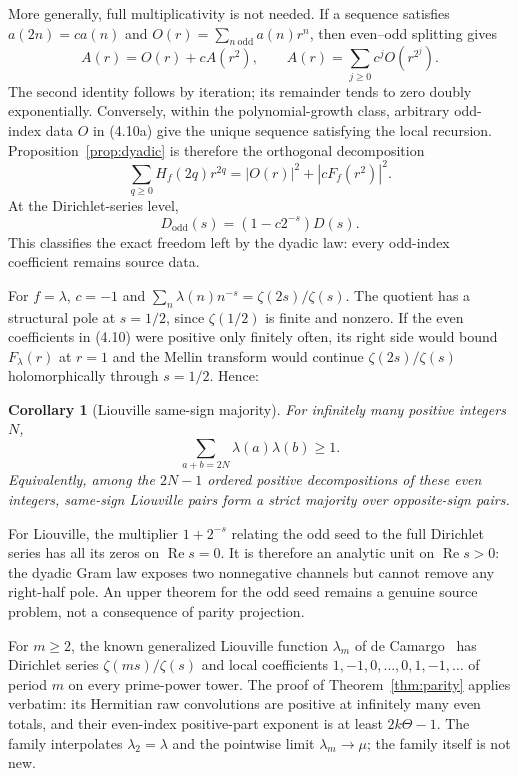 \documentclass[11pt]{article}
\newtheorem{corollary}[theorem]{Corollary}
\theoremstyle{remark}
\newcommand{\Rea}{\operatorname{Re}}
\begin{document}
More generally, full multiplicativity is not needed.  If a sequence satisfies $a(2n)=ca(n)$ and
$O(r)=\sum_{n\ \mathrm{odd}}a(n)r^n$, then even--odd splitting gives
\begin{equation}
 A(r)=O(r)+cA(r^2),
 \qquad
 A(r)=\sum_{j\geq0}c^jO(r^{2^j}).                             \tag{4.10a}
\end{equation}
The second identity follows by iteration; its remainder tends to zero doubly exponentially.
Conversely, within the polynomial-growth class, arbitrary odd-index data $O$ in (4.10a) give the
unique sequence satisfying the local recursion.  Proposition~\ref{prop:dyadic} is therefore the
orthogonal decomposition
\begin{equation}
 \sum_{q\geq0}H_f(2q)r^{2q}=|O(r)|^2+|cF_f(r^2)|^2.           \tag{4.10b}
\end{equation}
At the Dirichlet-series level,
\[
 D_{\mathrm{odd}}(s)=(1-c2^{-s})D(s).
\]
This classifies the exact freedom left by the dyadic law: every odd-index coefficient remains
source data.

For $f=\lambda$, $c=-1$ and
$\sum_n\lambda(n)n^{-s}=\zeta(2s)/\zeta(s)$.  The quotient has a structural pole at
$s=1/2$, since $\zeta(1/2)$ is finite and nonzero.  If the even coefficients in (4.10) were
positive only finitely often, its right side would bound $F_\lambda(r)$ at $r=1$ and the Mellin
transform would continue $\zeta(2s)/\zeta(s)$ holomorphically through $s=1/2$.  Hence:

\begin{corollary}[Liouville same-sign majority]
\label{cor:liouville}
For infinitely many positive integers $N$,
\begin{equation}
 \sum_{a+b=2N}\lambda(a)\lambda(b)\geq1.                     \tag{4.11}
\end{equation}
Equivalently, among the $2N-1$ ordered positive decompositions of these even integers, same-sign
Liouville pairs form a strict majority over opposite-sign pairs.
\end{corollary}

For Liouville, the multiplier $1+2^{-s}$ relating the odd seed to the full Dirichlet series has
all its zeros on $\Rea s=0$.  It is therefore an analytic unit on $\Rea s>0$: the dyadic Gram law
exposes two nonnegative channels but cannot remove any right-half pole.  An upper theorem for the
odd seed remains a genuine source problem, not a consequence of parity projection.

For $m\geq2$, the known generalized Liouville function $\lambda_m$ of de
Camargo~\cite{Camargo} has Dirichlet series $\zeta(ms)/\zeta(s)$ and local coefficients
$1,-1,0,\ldots,0,1,-1,\ldots$ of period $m$ on every prime-power tower.  The proof of
Theorem~\ref{thm:parity} applies verbatim: its Hermitian raw convolutions are positive at infinitely many even totals, and
their even-index positive-part exponent is at least $2k\Theta-1$.  The family interpolates
$\lambda_2=\lambda$ and the pointwise limit $\lambda_m\to\mu$; the family itself is not new.
\end{document}
